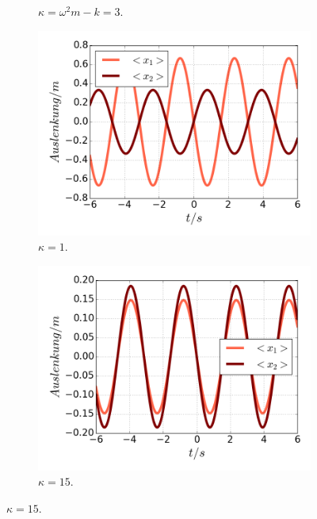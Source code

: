 \begin{figure}
\begin{subfigure}[t]{0.5\textwidth}
          \caption{$\kappa=\omega^2m-k=3$.}
          \label{fig:x1_null}
      \end{subfigure}
      \begin{subfigure}[t]{0.5\textwidth}
        \centering
        \includegraphics[width=\textwidth]{plots/<x12>nlschwach.png}
        \caption{$\kappa=1$.}
        \label{fig:schwach}
      \end{subfigure}
      \begin{subfigure}[t]{0.5\textwidth}
          \centering
          \includegraphics[width=\textwidth]{plots/<x12>nlstark.png}
          \caption{$\kappa=15$.}
          \label{fig:stark}
      \end{subfigure}

\end{figure}
